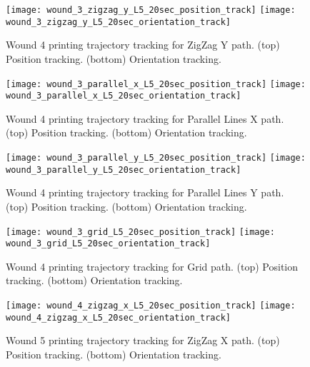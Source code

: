 \begin{figure}[htbp]
	\centering
	\texttt{[image: wound\_3\_zigzag\_y\_L5\_20sec\_position\_track]}
	\texttt{[image: wound\_3\_zigzag\_y\_L5\_20sec\_orientation\_track]}
\caption[Wound 4 printing trajectory tracking for ZigZag Y path.]{Wound 4 printing trajectory tracking for ZigZag Y path. (top) Position tracking. (bottom) Orientation tracking.}
	\label{fig:simulation_test_results_appendix_trajectory_tracking_wound_4_zizzag_y_tracking}
\end{figure}

\begin{figure}[htbp]
	\centering
	\texttt{[image: wound\_3\_parallel\_x\_L5\_20sec\_position\_track]}
	\texttt{[image: wound\_3\_parallel\_x\_L5\_20sec\_orientation\_track]}
	\caption[Wound 4 printing trajectory tracking for Parallel Lines X path.]{Wound 4 printing trajectory tracking for Parallel Lines X path. (top) Position tracking. (bottom) Orientation tracking.}
	\label{fig:simulation_test_results_appendix_trajectory_tracking_wound_4_parallel_x_tracking}
\end{figure}

\begin{figure}[htbp]
	\centering
	\texttt{[image: wound\_3\_parallel\_y\_L5\_20sec\_position\_track]}
	\texttt{[image: wound\_3\_parallel\_y\_L5\_20sec\_orientation\_track]}
    \caption[Wound 4 printing trajectory tracking for Parallel Lines Y path.]{Wound 4 printing trajectory tracking for Parallel Lines Y path. (top) Position tracking. (bottom) Orientation tracking.}
	\label{fig:simulation_test_results_appendix_trajectory_tracking_wound_4_parallel_y_tracking}
\end{figure}

\begin{figure}[htbp]
	\centering
	\texttt{[image: wound\_3\_grid\_L5\_20sec\_position\_track]}
	\texttt{[image: wound\_3\_grid\_L5\_20sec\_orientation\_track]}
    \caption[Wound 4 printing trajectory tracking for Grid path.]{Wound 4 printing trajectory tracking for Grid path. (top) Position tracking. (bottom) Orientation tracking.}
	\label{fig:simulation_test_results_appendix_trajectory_tracking_wound_4_grid_tracking}
\end{figure}


\begin{figure}[htbp]
	\centering
	\texttt{[image: wound\_4\_zigzag\_x\_L5\_20sec\_position\_track]}
	\texttt{[image: wound\_4\_zigzag\_x\_L5\_20sec\_orientation\_track]}
	\caption[Wound 5 printing trajectory tracking for ZigZag X path.]{Wound 5 printing trajectory tracking for ZigZag X path. (top) Position tracking. (bottom) Orientation tracking.}
    \label{fig:simulation_test_results_appendix_trajectory_tracking_wound_5_zizzag_x_tracking}
\end{figure}


